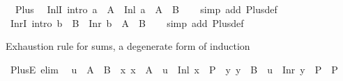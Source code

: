 \begin{isabellebody}
\isanewline
{}\isamarkupfalse%
\ {\isacharparenleft}{\kern0pt}\ Plus\ %
\isanewline
\isanewline
{}\isamarkupfalse%
\ InlI\ {\isacharbrackleft}{\kern0pt}intro{\isacharbang}{\kern0pt}{\isacharbrackright}{\kern0pt}{\isacharcolon}{\kern0pt}\ {\isachardoublequoteopen}a\ {\isasymin}\ A\ {\isasymLongrightarrow}\ Inl\ a\ {\isasymin}\ A\ {\isacharless}{\kern0pt}{\isacharplus}{\kern0pt}{\isachargreater}{\kern0pt}\ B{\isachardoublequoteclose}\isanewline
%
\isadelimproof
\ \ %
\endisadelimproof
%
\isatagproof
{}\isamarkupfalse%
\ {\isacharparenleft}{\kern0pt}simp\ add{\isacharcolon}{\kern0pt}\ Plus{\isacharunderscore}{\kern0pt}def{\isacharparenright}{\kern0pt}%
\endisatagproof
{\isafoldproof}%
%
\isadelimproof
\isanewline
%
\endisadelimproof
\isanewline
{}\isamarkupfalse%
\ InrI\ {\isacharbrackleft}{\kern0pt}intro{\isacharbang}{\kern0pt}{\isacharbrackright}{\kern0pt}{\isacharcolon}{\kern0pt}\ {\isachardoublequoteopen}b\ {\isasymin}\ B\ {\isasymLongrightarrow}\ Inr\ b\ {\isasymin}\ A\ {\isacharless}{\kern0pt}{\isacharplus}{\kern0pt}{\isachargreater}{\kern0pt}\ B{\isachardoublequoteclose}\isanewline
%
\isadelimproof
\ \ %
\endisadelimproof
%
\isatagproof
{}\isamarkupfalse%
\ {\isacharparenleft}{\kern0pt}simp\ add{\isacharcolon}{\kern0pt}\ Plus{\isacharunderscore}{\kern0pt}def{\isacharparenright}{\kern0pt}%
\endisatagproof
{\isafoldproof}%
%
\isadelimproof
%
\endisadelimproof
%
\begin{isamarkuptext}%
Exhaustion rule for sums, a degenerate form of induction%
\end{isamarkuptext}\isamarkuptrue%
\isamarkupfalse%
\ PlusE\ {\isacharbrackleft}{\kern0pt}elim{\isacharbang}{\kern0pt}{\isacharbrackright}{\kern0pt}{\isacharcolon}{\kern0pt}\isanewline
\ \ {\isachardoublequoteopen}u\ {\isasymin}\ A\ {\isacharless}{\kern0pt}{\isacharplus}{\kern0pt}{\isachargreater}{\kern0pt}\ B\ {\isasymLongrightarrow}\ {\isacharparenleft}{\kern0pt}{\isasymAnd}x{\isachardot}{\kern0pt}\ x\ {\isasymin}\ A\ {\isasymLongrightarrow}\ u\ {\isacharequal}{\kern0pt}\ Inl\ x\ {\isasymLongrightarrow}\ P{\isacharparenright}{\kern0pt}\ {\isasymLongrightarrow}\ {\isacharparenleft}{\kern0pt}{\isasymAnd}y{\isachardot}{\kern0pt}\ y\ {\isasymin}\ B\ {\isasymLongrightarrow}\ u\ {\isacharequal}{\kern0pt}\ Inr\ y\ {\isasymLongrightarrow}\ P{\isacharparenright}{\kern0pt}\ {\isasymLongrightarrow}\ P{\isachardoublequoteclose}\isanewline
%
\isadelimproof

\end{isabellebody}
